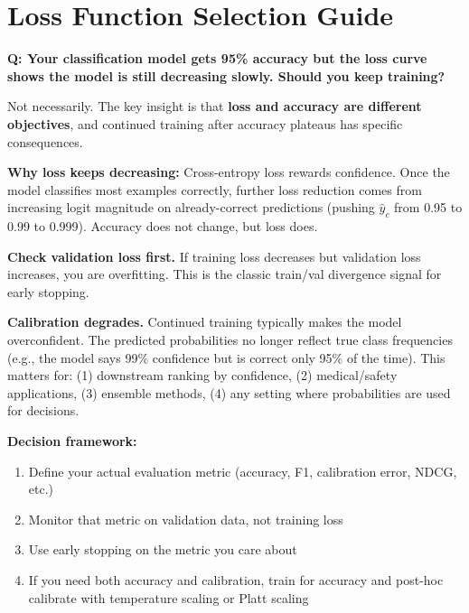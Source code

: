 \section{Loss Function Selection Guide}
\label{sec:loss_selection}

\begin{interviewq}
\textbf{Q: Your classification model gets 95\% accuracy but the loss curve shows the model is still decreasing slowly. Should you keep training?}

 \quad {} \quad \badgefreq{\freqhigh}

\stronganswer Not necessarily. The key insight is that \textbf{loss and accuracy are different objectives}, and continued training after accuracy plateaus has specific consequences.

\textbf{Why loss keeps decreasing:} Cross-entropy loss rewards confidence. Once the model classifies most examples correctly, further loss reduction comes from increasing logit magnitude on already-correct predictions (pushing $\hat{y}_c$ from 0.95 to 0.99 to 0.999). Accuracy does not change, but loss does.

\textbf{Check validation loss first.} If training loss decreases but validation loss increases, you are overfitting. This is the classic train/val divergence signal for early stopping.

\textbf{Calibration degrades.} Continued training typically makes the model overconfident. The predicted probabilities no longer reflect true class frequencies (e.g., the model says 99\% confidence but is correct only 95\% of the time). This matters for: (1) downstream ranking by confidence, (2) medical/safety applications, (3) ensemble methods, (4) any setting where probabilities are used for decisions.

\textbf{Decision framework:}
\begin{enumerate}
    \item Define your actual evaluation metric (accuracy, F1, calibration error, NDCG, etc.)
    \item Monitor that metric on validation data, not training loss
    \item Use early stopping on the metric you care about
    \item If you need both accuracy and calibration, train for accuracy and post-hoc calibrate with temperature scaling or Platt scaling
\end{enumerate}


\end{interviewq}
